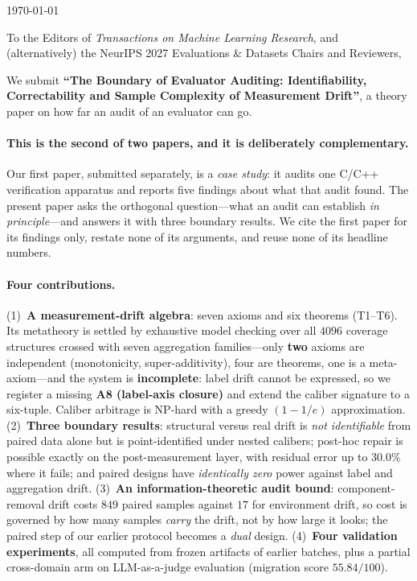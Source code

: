\documentclass[11pt]{article}
\begin{document}
\begin{flushright}
  \today
\end{flushright}

\noindent
To the Editors of \emph{Transactions on Machine Learning Research}, and (alternatively)
the NeurIPS 2027 Evaluations \& Datasets Chairs and Reviewers,

\bigskip
\noindent
We submit \textbf{``The Boundary of Evaluator Auditing: Identifiability, Correctability and
Sample Complexity of Measurement Drift''}, a theory paper on how far an audit of an evaluator can go.

\paragraph{This is the second of two papers, and it is deliberately complementary.}
Our first paper, submitted separately, is a \emph{case study}: it audits one C/C++ verification
apparatus and reports five findings about what that audit found. The present paper asks the
orthogonal question---what an audit can establish \emph{in principle}---and answers it with three
boundary results. We cite the first paper for its findings only, restate none of its arguments, and
reuse none of its headline numbers.

\paragraph{Four contributions.}
(1)~\textbf{A measurement-drift algebra}: seven axioms and six theorems (T1--T6). Its metatheory is
settled by exhaustive model checking over all $4096$ coverage structures crossed with seven
aggregation families---only \textbf{two} axioms are independent (monotonicity, super-additivity),
four are theorems, one is a meta-axiom---and the system is \textbf{incomplete}: label drift cannot
be expressed, so we register a missing \textbf{A8 (label-axis closure)} and extend the caliber
signature to a six-tuple. Caliber arbitrage is NP-hard with a greedy $(1-1/e)$ approximation.
(2)~\textbf{Three boundary results}: structural versus real drift is \emph{not identifiable} from
paired data alone but is point-identified under nested calibers; post-hoc repair is possible exactly
on the post-measurement layer, with residual error up to $30.0\%$ where it fails; and paired designs
have \emph{identically zero} power against label and aggregation drift.
(3)~\textbf{An information-theoretic audit bound}: component-removal drift costs $849$ paired samples
against $17$ for environment drift, so cost is governed by how many samples \emph{carry} the drift,
not by how large it looks; the paired step of our earlier protocol becomes a \emph{dual} design.
(4)~\textbf{Four validation experiments}, all computed from frozen artifacts of earlier batches, plus
a partial cross-domain arm on LLM-as-a-judge evaluation (migration score $55.84/100$).
\end{document}

